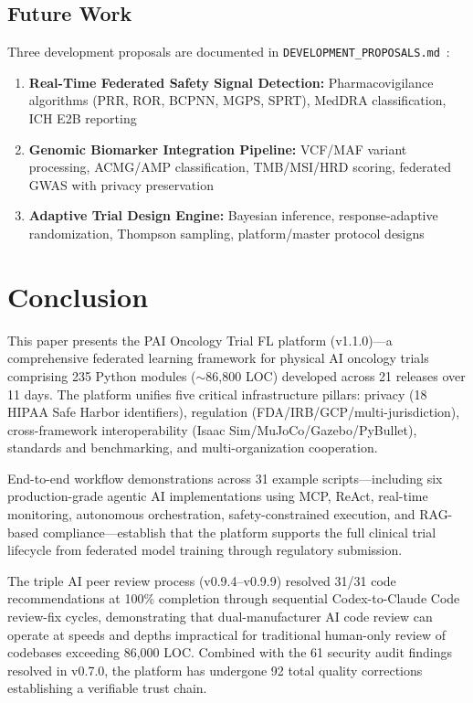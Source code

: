 \subsection{Future Work}

Three development proposals are documented in \texttt{DEVELOPMENT\_PROPOSALS.md}~\cite{kawchak2026fl}:
\begin{enumerate}
  \item \textbf{Real-Time Federated Safety Signal Detection:} Pharmacovigilance algorithms (PRR, ROR, BCPNN, MGPS, SPRT), MedDRA classification, ICH E2B reporting
  \item \textbf{Genomic Biomarker Integration Pipeline:} VCF/MAF variant processing, ACMG/AMP classification, TMB/MSI/HRD scoring, federated GWAS with privacy preservation
  \item \textbf{Adaptive Trial Design Engine:} Bayesian inference, response-adaptive randomization, Thompson sampling, platform/master protocol designs
\end{enumerate}

\section{Conclusion}
\label{sec:conclusion}

This paper presents the PAI Oncology Trial FL platform (v1.1.0)---a comprehensive federated learning framework for physical AI oncology trials comprising 235 Python modules ($\sim$86,800 LOC) developed across 21 releases over 11 days. The platform unifies five critical infrastructure pillars: privacy (18 HIPAA Safe Harbor identifiers), regulation (FDA/IRB/GCP/multi-jurisdiction), cross-framework interoperability (Isaac Sim/MuJoCo/Gazebo/PyBullet), standards and benchmarking, and multi-organization cooperation.

End-to-end workflow demonstrations across 31 example scripts---including six production-grade agentic AI implementations using MCP, ReAct, real-time monitoring, autonomous orchestration, safety-constrained execution, and RAG-based compliance---establish that the platform supports the full clinical trial lifecycle from federated model training through regulatory submission.

The triple AI peer review process (v0.9.4--v0.9.9) resolved 31/31 code recommendations at 100\% completion through sequential Codex-to-Claude Code review-fix cycles, demonstrating that dual-manufacturer AI code review can operate at speeds and depths impractical for traditional human-only review of codebases exceeding 86,000 LOC. Combined with the 61 security audit findings resolved in v0.7.0, the platform has undergone 92 total quality corrections establishing a verifiable trust chain.

